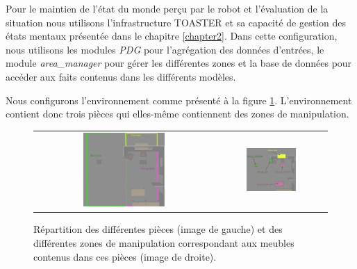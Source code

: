 \documentclass[a4paper,11pt,twoside]{StyleThese}
\begin{document}
Pour le maintien de l'état du monde perçu par le robot et l'évaluation de la situation nous utilisons l'infrastructure TOASTER et sa capacité de gestion des états mentaux présentée dans le chapitre \ref{chapter2}.
Dans cette configuration, nous utilisons les modules \textit{PDG} pour l'agrégation des données d'entrées, le module \textit{area\_manager} pour gérer les différentes zones et la base de données pour accéder aux faits contenus dans les différents modèles.

Nous configurons l'environnement comme présenté à la figure \ref{fig:areasMardi}.
L'environnement contient donc trois pièces qui elles-même contiennent des zones de manipulation.

\begin{figure}[ht!]
 \centering
 \begin{tabular}{cc}
  \includegraphics[width=0.475\textwidth]{img/areas.jpg} &
  \includegraphics[width=0.475\textwidth]{img/furnitures.jpg}
 \end{tabular}
 \caption{Répartition des différentes pièces (image de gauche) et des différentes zones de manipulation correspondant aux meubles contenus dans ces pièces (image de droite).}
 \label{fig:areasMardi}
 \end{figure}
\end{document}
